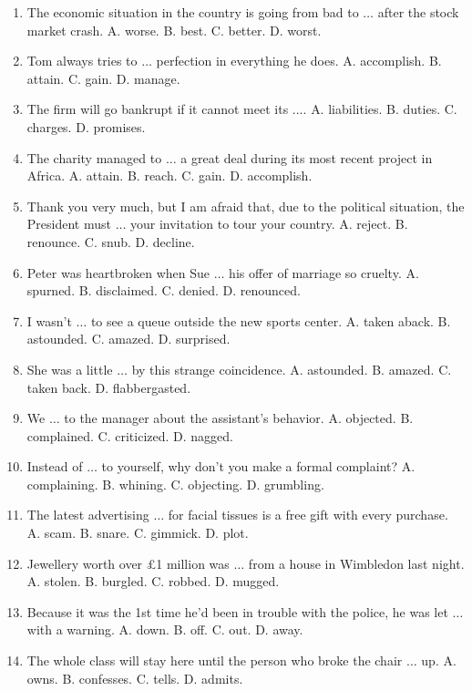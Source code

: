 \documentclass{article}
\numberwithin{equation}{section}
\begin{document}
\begin{enumerate}[leftmargin=8mm]
	\item The economic situation in the country is going from bad to $\ldots$ after the stock market crash. {\sf A.} worse. {\sf B.} best. {\sf C.} better. {\sf D.} worst.
	\item Tom always tries to $\ldots$ perfection in everything he does. {\sf A.} accomplish. {\sf B.} attain. {\sf C.} gain. {\sf D.} manage.
	\item The firm will go bankrupt if it cannot meet its $\ldots$. {\sf A.} liabilities. {\sf B.} duties. {\sf C.} charges. {\sf D.} promises.
	\item The charity managed to $\ldots$ a great deal during its most recent project in Africa. {\sf A.} attain. {\sf B.} reach. {\sf C.} gain. {\sf D.} accomplish.
	\item Thank you very much, but I am afraid that, due to the political situation, the President must $\ldots$ your invitation to tour your country. {\sf A.} reject. {\sf B.} renounce. {\sf C.} snub. {\sf D.} decline.
	\item Peter was heartbroken when Sue $\ldots$ his offer of marriage so cruelty. {\sf A.} spurned. {\sf B.} disclaimed. {\sf C.} denied. {\sf D.} renounced.
	\item I wasn't $\ldots$ to see a queue outside the new sports center. {\sf A.} taken aback. {\sf B.} astounded. {\sf C.} amazed. {\sf D.} surprised.
	\item She was a little $\ldots$ by this strange coincidence. {\sf A.} astounded. {\sf B.} amazed. {\sf C.} taken back. {\sf D.} flabbergasted.
	\item We $\ldots$ to the manager about the assistant's behavior. {\sf A.} objected. {\sf B.} complained. {\sf C.} criticized. {\sf D.} nagged.
	\item Instead of $\ldots$ to yourself, why don't you make a formal complaint? {\sf A.} complaining. {\sf B.} whining. {\sf C.} objecting. {\sf D.} grumbling.
	\item The latest advertising $\ldots$ for facial tissues is a free gift with every purchase. {\sf A.} scam. {\sf B.} snare. {\sf C.} gimmick. {\sf D.} plot.
	\item Jewellery worth over \pounds1 million was $\ldots$ from a house in Wimbledon last night. {\sf A.} stolen. {\sf B.} burgled. {\sf C.} robbed. {\sf D.} mugged.
	\item Because it was the 1st time he'd been in trouble with the police, he was let $\ldots$ with a warning. {\sf A.} down. {\sf B.} off. {\sf C.} out. {\sf D.} away.
	\item The whole class will stay here until the person who broke the chair $\ldots$ up. {\sf A.} owns. {\sf B.} confesses. {\sf C.} tells. {\sf D.} admits.

\end{enumerate}
\end{document}
